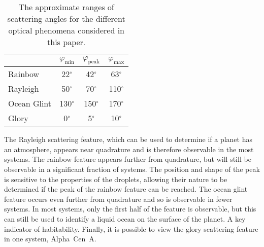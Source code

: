 \documentclass[
    usenatbib,
]{mnras}
\begin{document}
\begin{table}
    \centering
    \caption{
        The approximate ranges of scattering angles for the different optical phenomena considered in this paper.
    }
    \label{tab:phase_ranges}
    \begin{tabular}{ l c c c } 
        \toprule
        & $\varphi_\mathrm{min}$ & $\varphi_\mathrm{peak}$ & $\varphi_\mathrm{max}$ \\
        \midrule
        \midrule
        Rainbow    & 22$^\circ$    & 42$^\circ$    & 63$^\circ$ \\
        Rayleigh    & 50$^\circ$    & 70$^\circ$    & 110$^\circ$ \\
        Ocean Glint & 130$^\circ$   & 150$^\circ$   & 170$^\circ$ \\
        Glory       & 0$^\circ$     & 5$^\circ$     & 10$^\circ$ \\
        \bottomrule
    \end{tabular}
\end{table}

The Rayleigh scattering feature, which can be used to determine if a planet has an atmosphere, appears near quadrature and is therefore observable in the most systems.
%
The rainbow feature appears further from quadrature, but will still be observable in a significant fraction of systems.
%
The position and shape of the peak is sensitive to the properties of the droplets, allowing their nature to be determined if the peak of the rainbow feature can be reached.
%
The ocean glint feature occurs even further from quadrature and so is observable in fewer systems. 
%
In most systems, only the first half of the feature is observable, but this can still be used to identify a liquid ocean on the surface of the planet.
%
A key indicator of habitability. 
Finally, it is possible to view the glory scattering feature in one system, Alpha~Cen~A.
\end{document}
